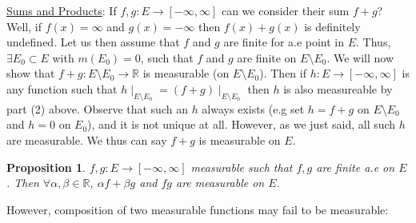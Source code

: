 \documentclass[11pt]{article}
\newtheorem*{prop}{Proposition}
\newcommand{\R}{\mathbb{R}}
\begin{document}
    \underline{Sums and Products}: If $f,g : E \rightarrow [-\infty, \infty]$ can we consider their sum $f+g$?
    Well, if $f(x) = \infty$ and $g(x) = -\infty$ then $f(x) + g(x)$ is definitely undefined.
    Let us then assume that $f$ and $g$ are finite for a.e point in $E$.
    Thus, $\exists E_0 \subset E$ with $m(E_0) = 0$, such that $f$ and $g$ are finite on $E \setminus E_0$.
    We will now show that $f+g: E \setminus E_0 \rightarrow \R$ is measurable (on $E\setminus E_0$).
    Then if $h: E \rightarrow [-\infty, \infty]$ is any function such that $h \mid_{E\setminus E_0} = (f+g)\mid_{E\setminus E_0}$ then $h$ is also measureable by part (2) above.
    Observe that such an $h$ always exists (e.g set $h = f+g$ on $E \setminus E_0$ and $h=0$ on $E_0$), and it is not unique at all.
    However, as we just said, all such $h$ are measurable.
    We thus can say $f+g$ is measurable on $E$.

    \begin{prop}
        $f,g: E \rightarrow [-\infty, \infty]$ measurable such that $f,g$ are finite a.e on $E$.
        Then $\forall \alpha, \beta \in \R$, $\alpha f + \beta g$ and $f g$ are measurable on $E$.
    \end{prop}

    However, composition of two measurable functions may fail to be measurable:
\end{document}
